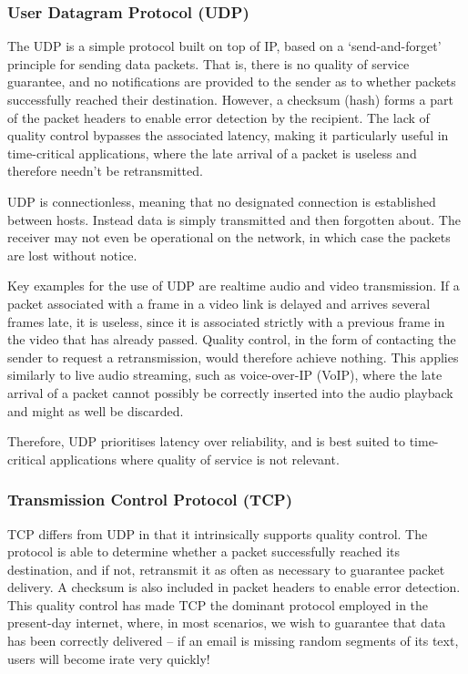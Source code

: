 \documentclass[aps, rmp, twocolumn, amsmath, amssymb, nofootinbib, superscriptaddress, longbibliography, floatfix, table-of-contents, eqsecnum]{revtex4-1}
\begin{document}
\subsubsection{User Datagram Protocol (UDP)} 

The UDP is a simple protocol built on top of IP, based on a `send-and-forget' principle for sending data packets. That is, there is no quality of service guarantee, and no notifications are provided to the sender as to whether packets successfully reached their destination. However, a checksum (hash) forms a part of the packet headers to enable error detection by the recipient. The lack of quality control bypasses the associated latency, making it particularly useful in time-critical applications, where the late arrival of a packet is useless and therefore needn't be retransmitted.

UDP is connectionless, meaning that no designated connection is established between hosts. Instead data is simply transmitted and then forgotten about. The receiver may not even be operational on the network, in which case the packets are lost without notice.

Key examples for the use of UDP are realtime audio and video transmission. If a packet associated with a frame in a video link is delayed and arrives several frames late, it is useless, since it is associated strictly with a previous frame in the video that has already passed. Quality control, in the form of contacting the sender to request a retransmission, would therefore achieve nothing. This applies similarly to live audio streaming, such as voice-over-IP (VoIP), where the late arrival of a packet cannot possibly be correctly inserted into the audio playback and might as well be discarded.

Therefore, UDP prioritises latency over reliability, and is best suited to time-critical applications where quality of service is not relevant.

%
%

\subsubsection{Transmission Control Protocol (TCP)} \label{sec:TCP} 

TCP differs from UDP in that it intrinsically supports quality control. The protocol is able to determine whether a packet successfully reached its destination, and if not, retransmit it as often as necessary to guarantee packet delivery. A checksum is also included in packet headers to enable error detection. This quality control has made TCP the dominant protocol employed in the present-day internet, where, in most scenarios, we wish to guarantee that data has been correctly delivered -- if an email is missing random segments of its text, users will become irate very quickly!
\end{document}
